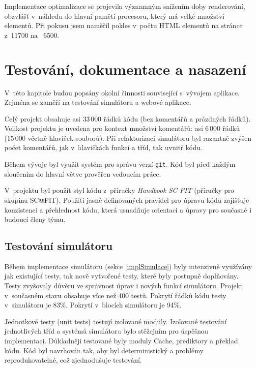 Implementace optimalizace se projevila významným snížením doby renderování, obzvlášť v~náhledu do hlavní paměti procesoru, který má velké množství elementů.
Při pokusu jsem naměřil pokles v~počtu HTML elementů na stránce z~11700 na ~6500.

\chapter{Testování, dokumentace a nasazení}
\label{testingchapter}

V~této kapitole budou popsány okolní činnosti související s~vývojem aplikace.
Zejména se zaměří na testování simulátoru a webové aplikace.

Celý projekt obsahuje asi 33\,000 řádků kódu (bez komentářů a prázdných řádků).
Velikost projektu je uvedena pro kontext množství komentářů: asi 6\,000 řádků (15\,000 včetně hlaviček souborů).
Při refaktorizaci simulátoru byl razantně zvýšen počet komentářů, jak v~hlavičkách funkcí a tříd, tak uvnitř kódu.

Během vývoje byl využit systém pro správu verzí \texttt{git}.
Kód byl před každým sloučením do hlavní větve prověřen vedoucím práce. 

V~projektu byl použit styl kódu z~příručky \emph{Handbook SC FIT} (příručky pro skupinu SC@FIT). 
Použití jasně definovaných pravidel pro úpravu kódu zajišťuje konzistenci a přehlednost kódu, která usnadňuje orientaci a úpravy pro současné i budoucí členy týmu.

\section{Testování simulátoru}


Během implementace simulátoru (sekce \ref{implSimulace}) byly intenzivně využívány jak existující testy, tak nově vytvořené testy, které byly postupně doplňovány.
Testy zvyšovaly důvěru ve správnost úprav i nových funkcí simulátoru.
Projekt v~současném stavu obsahuje více než 400 testů.
Pokrytí řádků kódu testy v~simulátoru je 83\%.
Pokrytí v~blocích simulátoru je 94\%.

Jednotkové testy (unit tests) testují izolované moduly.
Izolované testování jednotlivých tříd a systémů simulátoru bylo stěžejním pro úspěšnou implementaci.
Důkladněji testované byly moduly Cache, prediktory a překlad kódu.
Kód byl navrhován tak, aby byl deterministický a problémy reprodukovatelné, což zjednodušuje testování.


